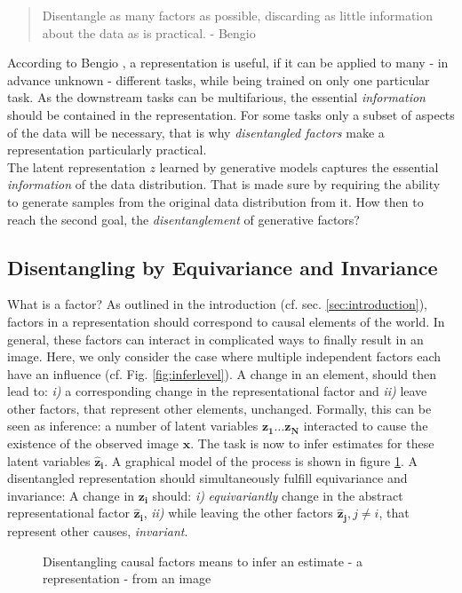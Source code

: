 	\begin{quote}
		{Disentangle as many factors as possible, discarding as little information about the data as is practical.} - Bengio \etal \cite{bengio13rep} %
	\end{quote}

	According to Bengio \etal \cite{bengio13rep},  a representation is useful, if it can be applied to many - in advance unknown - different tasks, while being trained on only one particular task.
	As the downstream tasks can be multifarious, the essential \textit{information} should be contained in the representation.
	For some tasks only a subset of aspects of the data will be necessary, that is why \textit{disentangled factors} make a representation particularly practical.\\
	The latent representation $z$ learned by generative models captures the essential \textit{information} of the data distribution. That is made sure by requiring the ability to generate samples from the original data distribution from it.
	How then to reach the second goal, the \textit{disentanglement} of generative factors?

	\subsection{Disentangling by Equivariance and Invariance}
		What is a factor? As outlined in the introduction (cf. sec. \ref{sec:introduction}), factors in a representation should correspond to causal elements of the world.
		In general, these factors can interact in complicated ways to finally result in an image. Here, we only consider the case where multiple independent factors each have an influence (cf. Fig. \ref{fig:inferlevel}).
		A change in an element, should then lead to: \emph{i)} a corresponding change in the representational factor and \emph{ii)} leave other factors, that represent other elements, unchanged.
		Formally, this can be seen as inference: a number of latent variables $\mathbf{z_1}\ldots\mathbf{z_N}$ interacted to cause the existence of the observed image $\mathbf{x}$. The task is now to infer estimates for these latent variables $\mathbf{\hat z_i}$. A graphical model of the process is shown in figure \ref{fig:infer}.
		A disentangled representation should simultaneously fulfill equivariance and invariance: A change in $\mathbf{z_i}$ should: \emph{i)} \textit{equivariantly} change in the abstract representational factor $\mathbf{\hat z_i}$, \emph{ii)} while leaving the other factors $\mathbf{\hat z_j}, j\neq i$, that represent other causes, \textit{invariant}.
		\begin{figure}[ht]
			\centering
			
			\caption{Disentangling causal factors means to infer an estimate - \ie a representation - from an image}
			\label{fig:infer}
		\end{figure}


